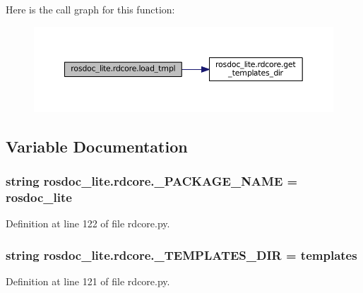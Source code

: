 Here is the call graph for this function\+:
\nopagebreak
\begin{figure}[H]
\begin{center}
\leavevmode
\includegraphics[width=350pt]{namespacerosdoc__lite_1_1rdcore_a85433f1cabd703f4e329c34162da84d4_cgraph}
\end{center}
\end{figure}




\subsection{Variable Documentation}
\subsubsection[{\texorpdfstring{\+\_\+\+P\+A\+C\+K\+A\+G\+E\+\_\+\+N\+A\+ME}{_PACKAGE_NAME}}]{\setlength{\rightskip}{0pt plus 5cm}string rosdoc\+\_\+lite.\+rdcore.\+\_\+\+P\+A\+C\+K\+A\+G\+E\+\_\+\+N\+A\+ME = \textquotesingle{}rosdoc\+\_\+lite\textquotesingle{}\hspace{0.3cm}{\ttfamily [private]}}\hypertarget{namespacerosdoc__lite_1_1rdcore_a10a7465b6eadd19efcdce0a1fd386552}{}\label{namespacerosdoc__lite_1_1rdcore_a10a7465b6eadd19efcdce0a1fd386552}


Definition at line 122 of file rdcore.\+py.

\subsubsection[{\texorpdfstring{\+\_\+\+T\+E\+M\+P\+L\+A\+T\+E\+S\+\_\+\+D\+IR}{_TEMPLATES_DIR}}]{\setlength{\rightskip}{0pt plus 5cm}string rosdoc\+\_\+lite.\+rdcore.\+\_\+\+T\+E\+M\+P\+L\+A\+T\+E\+S\+\_\+\+D\+IR = \textquotesingle{}templates\textquotesingle{}\hspace{0.3cm}{\ttfamily [private]}}\hypertarget{namespacerosdoc__lite_1_1rdcore_afc16859acf352f3906b2af46bb9e1e8c}{}\label{namespacerosdoc__lite_1_1rdcore_afc16859acf352f3906b2af46bb9e1e8c}


Definition at line 121 of file rdcore.\+py.

